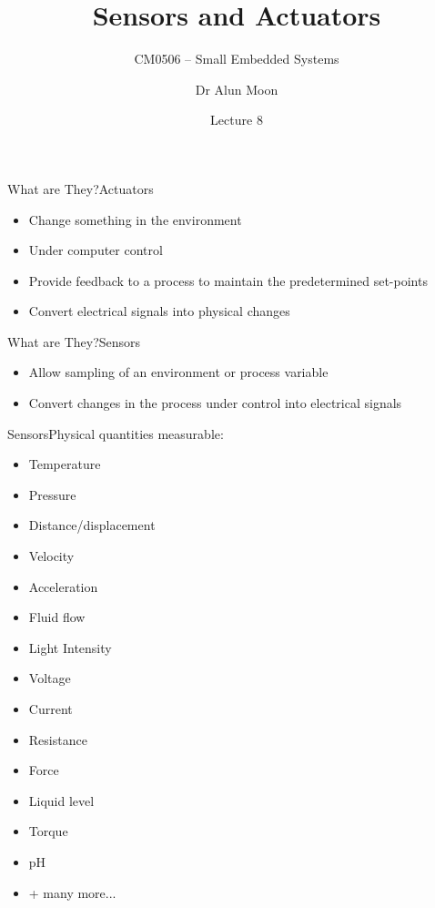 \documentclass[svgnames,x11names]{beamer}
\title{Sensors and Actuators}
\subtitle{CM0506 -- Small Embedded Systems}
\date{Lecture 8}
\author{Dr Alun Moon}
\institute{Department of Computer and Information Science}
\begin{document}
\frame\maketitle

\begin{frame}{What are They?}{Actuators}
  \begin{itemize}
  \item Change something in the environment 
  \item Under computer control
  \item  Provide feedback to a process to maintain the predetermined
    set-points 
  \item  Convert electrical signals into physical changes
  \end{itemize}
\end{frame}
\begin{frame}{What are They?}{Sensors}
  \begin{itemize}
  \item Allow sampling of an environment or process
    variable 
  \item Convert changes in the process under control into
    electrical signals
  \end{itemize}

\end{frame}

\begin{frame}{Sensors}{Physical quantities measurable:}
\begin{itemize}
\item Temperature
\item Pressure
\item Distance/displacement
\item Velocity
\item Acceleration
\item Fluid flow
\item Light Intensity
\item Voltage
\item Current
\item Resistance
\item Force
\item Liquid level
\item Torque
\item pH
\item + many more...
\end{itemize}
\end{frame}
\end{document}
